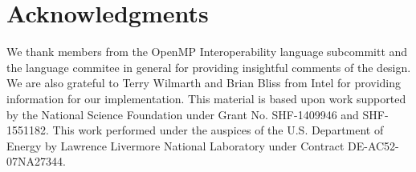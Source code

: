\documentclass{llncs}
\newcommand{\othertm}{\textsuperscript{$\star$}}
\begin{document}
\section*{Acknowledgments}
We thank members from the OpenMP Interoperability language subcommitt and the language 
commitee in general for providing insightful comments of the design. 
We are also grateful to Terry Wilmarth and Brian Bliss from Intel for providing information for our 
implementation. 
This material is based upon work supported by the National
Science Foundation under Grant No. SHF-1409946 and SHF-1551182. 
This work performed under the auspices of the U.S. Department of Energy by Lawrence Livermore National Laboratory under Contract DE-AC52-07NA27344.
%

\small{


}
\end{document}
